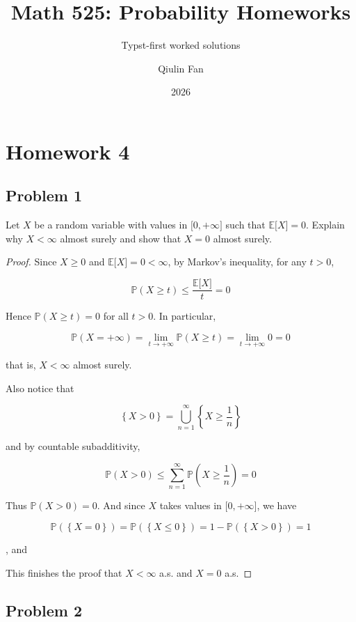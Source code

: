 \documentclass{qlnotes-export}
\title{Math 525: Probability Homeworks}
\subtitle{Typst-first worked solutions}
\author{Qiulin Fan}
\date{2026}
\begin{document}
\mainmatter
\chapter{Homework 4}\label{homework-4}

\section{Problem 1}\label{problem-1-4}

Let \(X\) be a random variable with values in \(\lbrack 0, + \infty\rbrack\) such that \({\mathbb{E}}\lbrack X\rbrack = 0\). Explain why \(X < \infty\) almost surely and show that \(X = 0\) almost surely.

\begin{proof}

Since \(X \geq 0\) and \({\mathbb{E}}\lbrack X\rbrack = 0 < \infty\), by Markov's inequality, for any \(t > 0\),

\[{\mathbb{P}}(X \geq t) \leq \frac{{\mathbb{E}}\lbrack X\rbrack}{t} = 0\]

Hence \({\mathbb{P}}(X \geq t) = 0\) for all \(t > 0\). In particular,

\[{\mathbb{P}}(X = + \infty) = \lim\limits_{t\rightarrow + \infty}{\mathbb{P}}(X \geq t) = \lim\limits_{t\rightarrow + \infty}0 = 0\]

that is, \(X < \infty\) almost surely.

Also notice that

\[\left\{ {X > 0} \right\} = \bigcup\limits_{n = 1}^{\infty}\left\{ {X \geq \frac{1}{n}} \right\}\]

and by countable subadditivity,

\[{\mathbb{P}}(X > 0) \leq \sum\limits_{n = 1}^{\infty}{\mathbb{P}}\left( {X \geq \frac{1}{n}} \right) = 0\]

Thus \({\mathbb{P}}(X > 0) = 0\). And since \(X\) takes values in \(\lbrack 0, + \infty\rbrack\), we have

\[{\mathbb{P}}(\left\{ {X = 0} \right\}) = {\mathbb{P}}(\left\{ {X \leq 0} \right\}) = 1 - {\mathbb{P}}(\left\{ {X > 0} \right\}) = 1\]

, and

This finishes the proof that \(X < \infty\) a.s. and \(X = 0\) a.s.

\end{proof}

\section{Problem 2}\label{problem-2-4}
\end{document}
